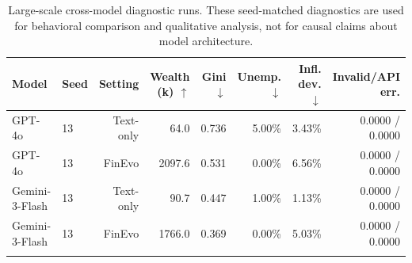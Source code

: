 \ifdefined\FinEvoAllowHistoricalPrePZeroEvidence\else
{}
\fi
\begin{table}[t]
\centering
\scriptsize
\setlength{\tabcolsep}{3pt}
\begin{tabular}{llrrrrrr}
\toprule
Model & Seed & Setting & Wealth (k) $\uparrow$ & Gini $\downarrow$ & Unemp. $\downarrow$ & Infl. dev. $\downarrow$ & Invalid/API err. \\
\midrule
GPT-4o & 13 & Text-only & 64.0 & 0.736 & 5.00\% & 3.43\% & 0.0000 / 0.0000 \\
GPT-4o & 13 & FinEvo & 2097.6 & 0.531 & 0.00\% & 6.56\% & 0.0000 / 0.0000 \\
\addlinespace
Gemini-3-Flash & 13 & Text-only & 90.7 & 0.447 & 1.00\% & 1.13\% & 0.0000 / 0.0000 \\
Gemini-3-Flash & 13 & FinEvo & 1766.0 & 0.369 & 0.00\% & 5.03\% & 0.0000 / 0.0000 \\
\addlinespace
\bottomrule
\end{tabular}
\caption{Large-scale cross-model diagnostic runs. These seed-matched diagnostics are used for behavioral comparison and qualitative analysis, not for causal claims about model architecture.}
\label{tab:cross_model_diagnostic}
\end{table}
